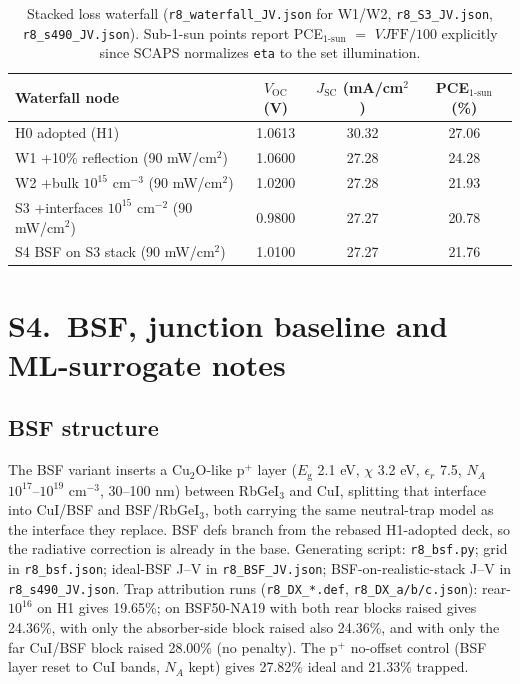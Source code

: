 \documentclass[11pt]{article}
\begin{document}
\begin{table}[htbp]
\centering
{\small\setlength{\tabcolsep}{3pt}
\begin{tabularx}{\textwidth}{Xccc}
\hline
Waterfall node & $V_{\mathrm{OC}}$ (V) & $J_{\mathrm{SC}}$ (mA/cm$^{2}$) & PCE$_{1\text{-sun}}$ (\%)\\
\hline
H0 adopted (H1) & 1.0613 & 30.32 & 27.06\\
W1 +10\% reflection (90 mW/cm$^{2}$) & 1.0600 & 27.28 & 24.28\\
W2 +bulk $10^{15}$ cm$^{-3}$ (90 mW/cm$^{2}$) & 1.0200 & 27.28 & 21.93\\
S3 +interfaces $10^{15}$ cm$^{-2}$ (90 mW/cm$^{2}$) & 0.9800 & 27.27 & 20.78\\
S4 BSF on S3 stack (90 mW/cm$^{2}$) & 1.0100 & 27.27 & 21.76\\
\hline
\end{tabularx}}
\caption{Stacked loss waterfall (\texttt{r8\_waterfall\_JV.json} for W1/W2, \texttt{r8\_S3\_JV.json}, \texttt{r8\_s490\_JV.json}). Sub-1-sun points report PCE$_{1\text{-sun}}$ $=$ $VJ\mathrm{FF}/100$ explicitly since SCAPS normalizes \texttt{eta} to the set illumination.}
\end{table}

\section*{S4.\ BSF, junction baseline and ML-surrogate notes}
\subsection*{BSF structure}
The BSF variant inserts a Cu$_{2}$O-like p$^{+}$ layer ($E_{\mathrm{g}}$ 2.1 eV, $\chi$ 3.2 eV, $\epsilon_{r}$ 7.5, $N_{A}$ $10^{17}$--$10^{19}$ cm$^{-3}$, 30--100 nm) between RbGeI$_{3}$ and CuI, splitting that interface into CuI/BSF and BSF/RbGeI$_{3}$, both carrying the same neutral-trap model as the interface they replace. BSF defs branch from the rebased H1-adopted deck, so the radiative correction is already in the base. Generating script: \texttt{r8\_bsf.py}; grid in \texttt{r8\_bsf.json}; ideal-BSF J--V in \texttt{r8\_BSF\_JV.json}; BSF-on-realistic-stack J--V in \texttt{r8\_s490\_JV.json}. Trap attribution runs (\texttt{r8\_DX\_*.def}, \texttt{r8\_DX\_a/b/c.json}): rear-$10^{16}$ on H1 gives 19.65\%; on BSF50-NA19 with both rear blocks raised gives 24.36\%, with only the absorber-side block raised also 24.36\%, and with only the far CuI/BSF block raised 28.00\% (no penalty). The p$^{+}$ no-offset control (BSF layer reset to CuI bands, $N_{A}$ kept) gives 27.82\% ideal and 21.33\% trapped.
\end{document}
